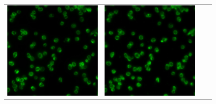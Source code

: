 \begin{figure}[htb]
\begin{tabularx}{\textwidth}{YYYY}
            \includegraphics{bilder/ER/gt.jpg} & \includegraphics{bilder/ER/er.jpg} &

\end{tabularx}
\end{figure}
